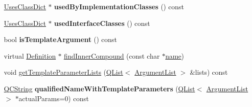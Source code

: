 \begin{DoxyCompactItemize}
\item 
\hypertarget{class_class_def_affe536e52200d391064d6424e4cca60a}{\hyperlink{class_uses_class_dict}{Uses\-Class\-Dict} $\ast$ {\bfseries used\-By\-Implementation\-Classes} () const }\label{class_class_def_affe536e52200d391064d6424e4cca60a}

\item 
\hypertarget{class_class_def_a750addde329b334fcd3a7778be2ab27a}{\hyperlink{class_uses_class_dict}{Uses\-Class\-Dict} $\ast$ {\bfseries used\-Interface\-Classes} () const }\label{class_class_def_a750addde329b334fcd3a7778be2ab27a}

\item 
\hypertarget{class_class_def_a2a499722bfcb37d7a130073b1582938e}{bool {\bfseries is\-Template\-Argument} () const }\label{class_class_def_a2a499722bfcb37d7a130073b1582938e}

\item 
virtual \hyperlink{class_definition}{Definition} $\ast$ \hyperlink{class_class_def_a5f4c10da520e9553c62483027168c42c}{find\-Inner\-Compound} (const char $\ast$\hyperlink{class_definition_a2c310e06c9aadc6fb218f80fcbb5c695}{name})
\item 
void \hyperlink{class_class_def_aef20cac5706a02dbb50518d24b38f464}{get\-Template\-Parameter\-Lists} (\hyperlink{class_q_list}{Q\-List}$<$ \hyperlink{class_argument_list}{Argument\-List} $>$ \&lists) const 
\item 
\hypertarget{class_class_def_ab123fdbde52be05a46788508ce1d464c}{\hyperlink{class_q_c_string}{Q\-C\-String} {\bfseries qualified\-Name\-With\-Template\-Parameters} (\hyperlink{class_q_list}{Q\-List}$<$ \hyperlink{class_argument_list}{Argument\-List} $>$ $\ast$actual\-Params=0) const }\label{class_class_def_ab123fdbde52be05a46788508ce1d464c}


\end{DoxyCompactItemize}
